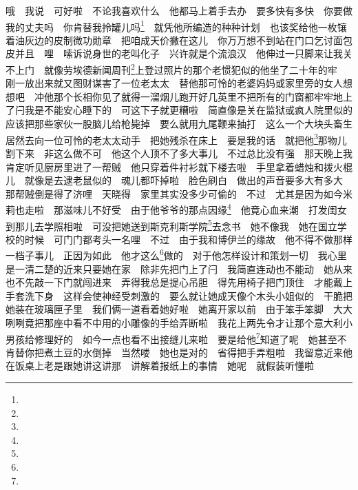 \par 哦　我说　可好啦　不论我喜欢什么　他都马上着手去办　要多快有多快　你要做我的丈夫吗　你肯替我拎罐儿吗\footnote{}　就凭他所编造的种种计划　也该奖给他一枚镶着油灰边的皮制微功勋章　把咱成天价撇在这儿　你万万想不到站在门口乞讨面包皮并且　哩　嗦诉说身世的老叫化子　兴许就是个流浪汉　他伸过一只脚来让我关不上门　就像劳埃德新闻周刊\footnote{}上登过照片的那个老惯犯似的他坐了二十年的牢　刚一放出来就又图财谋害了一位老太太　替他那可怜的老婆妈妈或家里旁的女人想想吧　冲他那个长相你见了就得一溜烟儿跑开好几英里不把所有的门窗都牢牢地上了闩我是不能安心睡下的　可这下子就更糟啦　简直像是关在监狱或疯人院里似的　应该把那些家伙一股脑儿给枪毙掉　要么就用九尾鞭来抽打　这么一个大块头畜生居然去向一位可怜的老太太动手　把她残杀在床上　要是我的话　就把他\footnote{}那物儿割下来　非这么做不可　他这个人顶不了多大事儿　不过总比没有强　那天晚上我肯定听见厨房里进了一帮贼　他只穿着件衬衫就下楼去啦　手里拿着蜡烛和拨火棍儿　就像是去逮老鼠似的　魂儿都吓掉啦　脸色刷白　做出的声音要多大有多大　那帮贼倒是得了济哩　天晓得　家里其实没多少可偷的　不过　尤其是因为如今米莉也走啦　那滋味儿不好受　由于他爷爷的那点因缘\footnote{}　他竟心血来潮　打发闺女到那儿去学照相啦　可没把她送到斯克利斯学院\footnote{}去念书　她不像我　她在国立学校的时候　可门门都考头一名哩　不过　由于我和博伊兰的缘故　他不得不做那样一档子事儿　正因为如此　他才这么\footnote{}做的　对于他怎样设计和策划一切　我心里是一清二楚的近来只要她在家　除非先把门上了闩　我简直连动也不能动　她从来也不先敲一下门就闯进来　弄得我总是提心吊胆　得先用椅子把门顶住　才能戴上手套洗下身　这样会使神经受刺激的　要么就让她成天像个木头小姐似的　干脆把她装在玻璃匣子里　我们俩一道看着她好啦　她离开家以前　由于笨手笨脚　大大咧咧竟把那座中看不中用的小雕像的手给弄断啦　我花上两先令才让那个意大利小男孩给修理好的　如今一点也看不出接缝儿来啦　要是给他\footnote{}知道了呢　她甚至不肯替你把煮土豆的水倒掉　当然喽　她也是对的　省得把手弄粗啦　我留意近来他在饭桌上老是跟她讲这讲那　讲解着报纸上的事情　她呢　就假装听懂啦　
